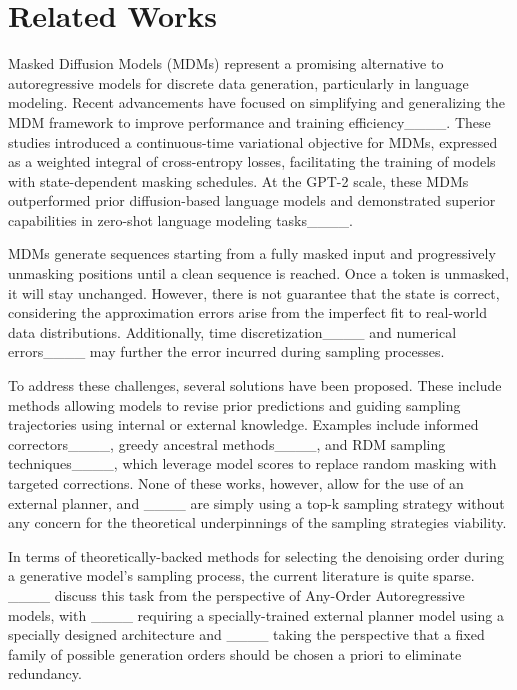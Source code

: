 \section{Related Works}
Masked Diffusion Models (MDMs) represent a promising alternative to autoregressive models for discrete data generation, particularly in language modeling. Recent advancements have focused on simplifying and generalizing the MDM framework to improve performance and training efficiency____. These studies introduced a continuous-time variational objective for MDMs, expressed as a weighted integral of cross-entropy losses, facilitating the training of models with state-dependent masking schedules. At the GPT-2 scale, these MDMs outperformed prior diffusion-based language models and demonstrated superior capabilities in zero-shot language modeling tasks____. 

MDMs generate sequences starting from a fully masked input and progressively unmasking positions until a clean sequence is reached. Once a token is unmasked, it will stay unchanged. However, there is not guarantee that the state is correct, considering the approximation errors arise from the imperfect fit to real-world data distributions. Additionally, time discretization____ and numerical errors____ may further the error incurred during sampling processes.

To address these challenges, several solutions have been proposed. These include methods allowing models to revise prior predictions and guiding sampling trajectories using internal or external knowledge. Examples include informed correctors____, greedy ancestral methods____, and RDM sampling techniques____, which leverage model scores to replace random masking with targeted corrections. None of these works, however, allow for the use of an external planner, and ____ are simply using a top-k sampling strategy without any concern for the theoretical underpinnings of the sampling strategies viability.

In terms of theoretically-backed methods for selecting the denoising order during a generative model's sampling process, the current literature is quite sparse. ____ discuss this task from the perspective of Any-Order Autoregressive models,  with ____ requiring a specially-trained external planner model using a specially designed architecture and ____ taking the perspective that a fixed family of possible generation orders should be chosen a priori to eliminate redundancy.

